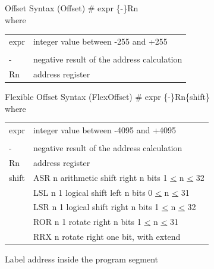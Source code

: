 {\bigskip
Offset Syntax (Offset)
\bi
      \ite \# expr
      \ite \{-\}Rn\\
      where\\
      \begin{tabular}{l l}
         expr & integer value between -255 and +255\\
	    & \\
	 - & negative result of the address calculation\\
	 Rn & address register\\
      \end{tabular}

\ei

\bigskip
Flexible Offset Syntax (FlexOffset)
\bi
      \ite \# expr
      \ite \{-\}Rn\{shift\}\\
      where\\
      \begin{tabular}{l l}
         expr & integer value between -4095 and +4095\\
	    & \\
	 - & negative result of the address calculation\\
	 Rn & address register\\
	 shift & ASR n  arithmetic shift right n bits 1 \underline{\textless} n \underline{\textless} 32\\
	       & LSL n 1 logical shift left n bits 0 \underline{\textless} n \underline{\textless} 31\\
	       & LSR n 1 logical shift right n bits 1 \underline{\textless} n \underline{\textless} 32\\
	       & ROR n 1 rotate right n bits 1 \underline{\textless} n \underline{\textless} 31\\
	       & RRX n  rotate right one bit, with extend\\
      \end{tabular}

\ei
\bigskip
Label
\bi
      \ite address inside the program segment
\ei

\begin{landscape} 

\end{landscape}}
